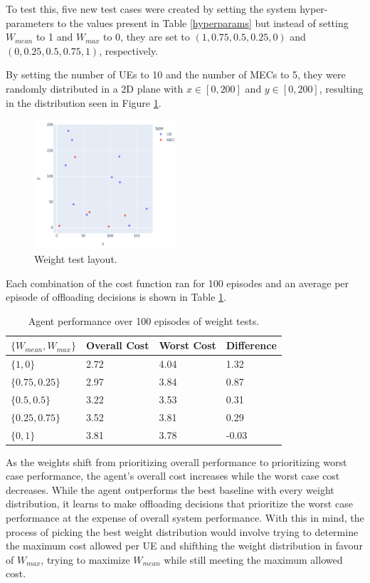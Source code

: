 To test this, five new test cases were created by setting the system hyper-parameters to the values present in Table \ref{hyperparams} but instead of setting $W_{mean}$ to 1 and $W_{max}$ to 0, they are set to $(1, 0.75, 0.5, 0.25, 0)$ and $(0, 0.25, 0.5, 0.75, 1)$, respectively.

By setting the number of \acrshort{UE}s to 10 and the number of \acrshort{MEC}s to 5, they were randomly distributed in a 2D plane with $x \in [0, 200]$ and $y \in [0, 200]$, resulting in the distribution seen in Figure \ref{weight_test}.

\begin{figure}[H]
  \centering
  \includegraphics[width=200px]{images/5_10_layout.png}
  \caption{Weight test layout.}  \label{weight_test}
\end{figure}

Each combination of the cost function ran for 100 episodes and an average per episode of offloading decisions is shown in Table \ref{weight_table}.

\begin{table}[H]
\centering
\begin{tabular}{|l|l|l|l|}
\hline
$\{W_{mean}, W_{max}\}$ & Overall Cost & Worst Cost & Difference \\ \hline
$\{1, 0\}$       & 2.72 & 4.04 & 1.32\\
$\{0.75, 0.25\}$  & 2.97 & 3.84  & 0.87\\
$\{0.5, 0.5\}$ & 3.22 & 3.53 & 0.31\\ 
$\{0.25, 0.75\}$ & 3.52 & 3.81 & 0.29\\ 
$\{0, 1\}$ & 3.81 & 3.78 & -0.03 \\ \hline
\end{tabular}
\caption{Agent performance over 100 episodes of weight tests.} \label{weight_table}
\end{table}

As the weights shift from prioritizing overall performance to prioritizing worst case performance, the agent's overall cost increases while the worst case cost decreases. While the agent outperforms the best baseline with every weight distribution, it learns to make offloading decisions that prioritize the worst case performance at the expense of overall system performance. With this in mind, the process of picking the best weight distribution would involve trying to determine the maximum cost allowed per \acrshort{UE} and shifthing the weight distribution in favour of $W_{max}$, trying to maximize $W_{mean}$ while still meeting the maximum allowed cost.
